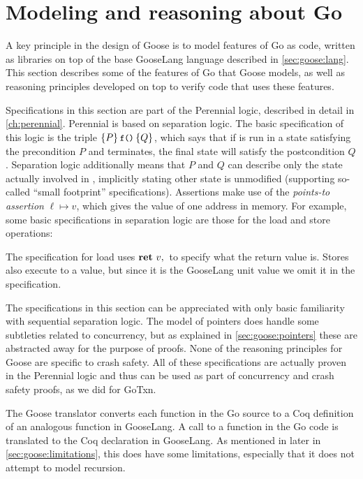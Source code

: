 \section{Modeling and reasoning about Go}%
\label{sec:goose:reasoning}

A key principle in the design of Goose is to model features of Go as code,
written as libraries on top of the base GooseLang language described in
\cref{sec:goose:lang}. This section describes some of the features of Go that
Goose models, as well as reasoning principles developed on top to verify code
that uses these features.

Specifications in this section are part of the Perennial logic, described in
detail in \cref{ch:perennial}. Perennial is based on separation logic. The basic
specification of this logic is the triple
$\hoare{P}{\cc{f()}}{Q}$, which says that if  is run in a state
satisfying the precondition $P$ and terminates, the final state will satisfy the
postcondition $Q$. Separation logic additionally means that $P$ and $Q$ can
describe only the state actually involved in , implicitly stating other
state is unmodified (supporting so-called ``small footprint'' specifications).
Assertions make use of the \emph{points-to assertion} $\ell \mapsto v$, which
gives the value of one address in memory. For example, some basic specifications
in separation logic are those for the load and store operations:
%
\begin{mathpar}

\end{mathpar}
The specification for load uses $\Ret{v}$ to specify what the return value is.
Stores also execute to a value, but since it is the GooseLang unit value we omit
it in the specification.

The specifications in this section can be appreciated with only basic
familiarity with sequential separation logic. The model of pointers does handle
some subtleties related to concurrency, but as explained in
\cref{sec:goose:pointers} these are abstracted away for the purpose of proofs.
None of the reasoning principles for Goose are specific to crash safety. All of these
specifications are actually proven in the Perennial logic and thus can be used
as part of concurrency and crash safety proofs, as we did for GoTxn.

The Goose translator converts each function in the Go source to a Coq definition
of an analogous function in GooseLang. A call to a function  in the Go
code is translated to the  Coq declaration in GooseLang. As mentioned in
later in \cref{sec:goose:limitations}, this does have some limitations,
especially that it does not attempt to model recursion.

